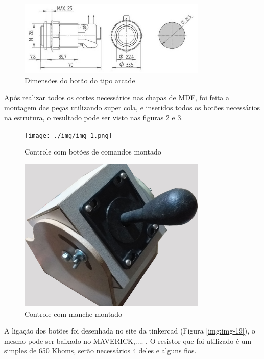 \documentclass[
	12pt,			%
	openright,		%
	oneside,			%
	a4paper,			%
	chapter=TITLE,		%
	english,			%
	brazil,			%
	]{abntex2}
\begin{document}
\begin{figure}[H]
	\centering
		\includegraphics[width=0.8\textwidth]{./img/img-13.jpg}
		\caption{Dimensões do botão do tipo arcade}
		\label{img:img-13}
\end{figure}

Após realizar todos os cortes necessários nas chapas de MDF, foi feita a montagem das peças utilizando super cola, e inseridos todos os botões necessários na estrutura, o resultado pode ser visto nas figuras \ref{img:img-1} e \ref{img:img-10}.

\begin{figure}[H]
	\centering
		\texttt{[image: ./img/img-1.png]}
		\caption{Controle com botões de comandos montado}
		\label{img:img-1}
\end{figure}

\begin{figure}[H]
	\centering
		\includegraphics[width=0.8\textwidth]{./img/img-10.jpg}
		\caption{Controle com manche montado}
		\label{img:img-10}
\end{figure}

A ligação dos botões foi desenhada no site da tinkercad (Figura \ref{img:img-19}), o mesmo pode ser baixado no MAVERICK,.... . O resistor que foi utilizado é um simples de 650 Khoms, serão necessários 4 deles e alguns fios.
\end{document}
